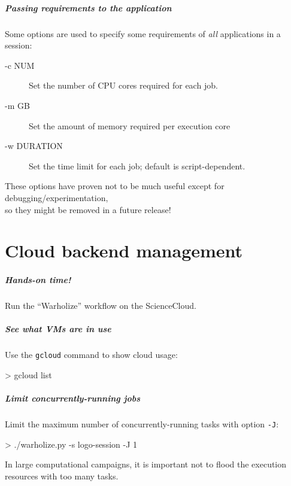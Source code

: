 \documentclass[english,serif,mathserif,usenames,dvipsnames]{beamer}
\begin{document}
\begin{frame}
  \frametitle{Passing requirements to the application}
  Some options are used to specify some requirements of \emph{all}
  applications in a session:
  \begin{description}
  \item[-c NUM] Set the number of CPU cores required for each job.
  \item[-m GB] Set the amount of memory required per execution core
  \item[-w DURATION] Set the time limit for each job; default is script-dependent.
  \end{description}

  \+ These options have proven not to be much useful except for
  debugging/experimentation, \\ so \alert{they might be removed in a
    future release!}
\end{frame}


\part{Cloud backend management}

\begin{frame}
  \frametitle{Hands-on time!}
  \begin{exercise}
    Run the ``Warholize'' workflow on the ScienceCloud.
  \end{exercise}
\end{frame}


\begin{frame}
  \frametitle{See what VMs are in use}

  Use the \texttt{gcloud} command to show cloud usage:
\begin{semiverbatim}
    > gcloud list
\end{semiverbatim}

\end{frame}


\begin{frame}
  \frametitle{Limit concurrently-running jobs}

  Limit the maximum number of concurrently-running tasks
  with option \texttt{-J}:
\begin{semiverbatim}
    > ./warholize.py -s logo-session -J 1
\end{semiverbatim}

  \+ In large computational campaigns, it is important not to flood the
  execution resources with too many tasks.
\end{frame}
\end{document}
